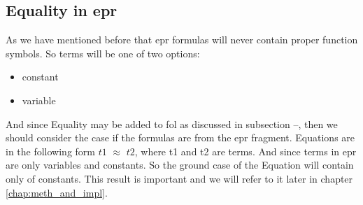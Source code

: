 \subsection{Equality in \ac{epr}}
As we have mentioned before that \ac{epr} formulas will never contain proper function symbols. So terms will be one of two options:
\begin{itemize}
	\item constant
	\item variable
\end{itemize}


And since Equality may be added to \ac{fol} as discussed in subsection --, then we should consider the case if the formulas are from the \ac{epr} fragment. Equations are in the following form $t1$ $\approx$ $t2$, where t1 and t2 are terms. And since terms in \ac{epr} are only variables and constants. So the ground case of the Equation will contain only of constants. This result is important and we will refer to it later in chapter \ref{chap:meth_and_impl}.
 
